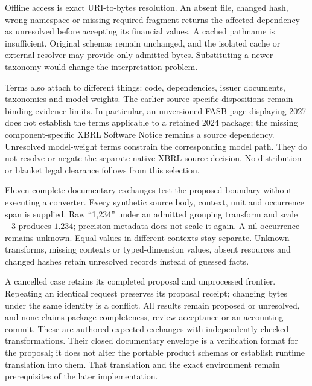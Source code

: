 Offline access is exact URI-to-bytes resolution. An absent file, changed hash, wrong namespace or missing required fragment returns the affected dependency as unresolved before accepting its financial values. A cached pathname is insufficient. Original schemas remain unchanged, and the isolated cache or external resolver may provide only admitted bytes. Substituting a newer taxonomy would change the interpretation problem.

Terms also attach to different things: code, dependencies, issuer documents, taxonomies and model weights. The earlier source-specific dispositions remain binding evidence limits. In particular, an unversioned FASB page displaying 2027 does not establish the terms applicable to a retained 2024 package; the missing component-specific XBRL Software Notice remains a source dependency. Unresolved model-weight terms constrain the corresponding model path. They do not resolve or negate the separate native-XBRL source decision. No distribution or blanket legal clearance follows from this selection.

Eleven complete documentary exchanges test the proposed boundary without executing a converter. Every synthetic source body, context, unit and occurrence span is supplied. Raw ``1,234'' under an admitted grouping transform and scale \(-3\) produces \(1.234\); precision metadata does not scale it again. A nil occurrence remains unknown. Equal values in different contexts stay separate. Unknown transforms, missing contexts or typed-dimension values, absent resources and changed hashes retain unresolved records instead of guessed facts.

A cancelled case retains its completed proposal and unprocessed frontier. Repeating an identical request preserves its proposal receipt; changing bytes under the same identity is a conflict. All results remain proposed or unresolved, and none claims package completeness, review acceptance or an accounting commit. These are authored expected exchanges with independently checked transformations. Their closed documentary envelope is a verification format for the proposal; it does not alter the portable product schemas or establish runtime translation into them. That translation and the exact environment remain prerequisites of the later implementation.


